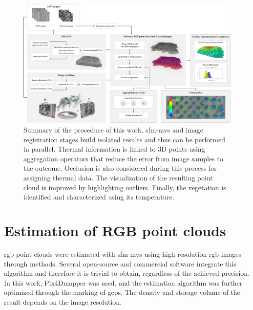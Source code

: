 \begin{figure}
    \centering
    \caption{Summary of the procedure of this work. \acrshort{sfm}-\acrshort{mvs} and image registration stages build isolated results and thus can be performed in parallel. Thermal information is linked to 3D points using aggregation operators that reduce the error from image samples to the outcome. Occlusion is also considered during this process for assigning thermal data. The visualization of the resulting point cloud is improved by highlighting outliers. Finally, the vegetation is identified and characterized using its temperature. }
    \label{fig:thermal_projection_overview}
    \includegraphics[width=\linewidth]{figs/thermal_projection/thermal_projection.png}
\end{figure}

\section{Estimation of RGB point clouds}

\acrshort{rgb} point clouds were estimated with \acrshort{sfm}-\acrshort{mvs} using high-resolution \acrshort{rgb} images through methods. Several open-source and commercial software integrate this algorithm and therefore it is trivial to obtain, regardless of the achieved precision. In this work, Pix4Dmapper was used, and the estimation algorithm was further optimized through the marking of \acrshort{gcp}s. The density and storage volume of the result depends on the image resolution.


